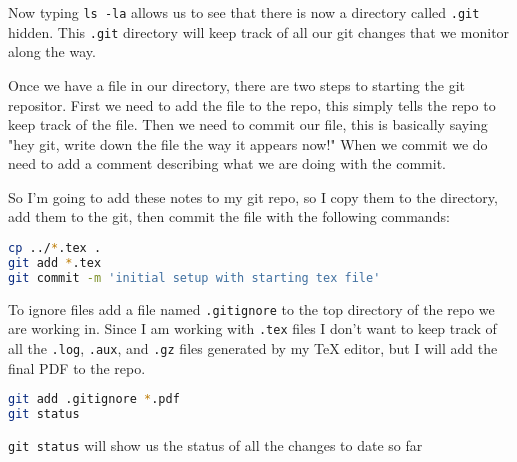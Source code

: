 \documentclass[a4paper]{spie} %
\begin{document}
Now typing \texttt{ls -la} allows us to see that there is now a directory called \texttt{.git} hidden. This \texttt{.git} directory will keep track of all our git changes that we monitor along the way.

Once we have a file in our directory, there are two steps to starting the git repositor. First we need to add the file to the repo, this simply tells the repo to keep track of the file. Then we need to commit our file, this is basically saying "hey git, write down the file the way it appears now!" When we commit we do need to add a comment describing what we are doing with the commit.

So I'm going to add these notes to my git repo, so I copy them to the directory, add them to the git, then commit the file with the following commands:
\begin{lstlisting}[language=bash]
cp ../*.tex .
git add *.tex
git commit -m 'initial setup with starting tex file'
\end{lstlisting}



To ignore files add a file named \texttt{.gitignore} to the top directory of the repo we are working in. Since I am working with \texttt{.tex} files I don't want to keep track of all the \texttt{.log}, \texttt{.aux}, and \texttt{.gz} files generated by my TeX editor, but I will add the final PDF to the repo.
\begin{lstlisting}[language=bash]
git add .gitignore *.pdf
git status
\end{lstlisting}

\texttt{git status} will show us the status of all the changes to date so far
\end{document}
